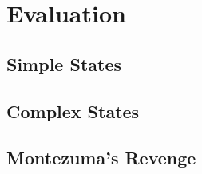 \chapter{Evaluation}

\section{Simple States}

\section{Complex States}

\section{Montezuma's Revenge}

